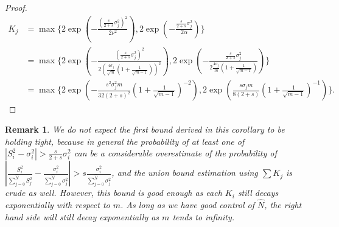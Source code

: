 \documentclass[pdflatex,sn-mathphys-num]{sn-jnl}%
\theoremstyle{thmstyleone}%
\theoremstyle{thmstyletwo}%
\newtheorem{remark}{Remark}%
\theoremstyle{thmstylethree}%
\begin{document}
\begin{proof}
	\begin{align*}
		K_j &= \max\{2\exp(-\frac{(\frac{s}{2+s}\sigma^2_j)^2}{2\nu^2}),2\exp(-\frac{\frac{s}{2+s}\sigma^2_j}{2\alpha}) \}\\
		&= \max\{2\exp(-\frac{(\frac{s}{2+s}\sigma^2_j)^2}{2(\frac{4\sigma_j}{\sqrt{m}}(1+\frac{1}{\sqrt{m-1}}))^2}), 2\exp(-\frac{\frac{s}{2+s}\sigma^2_j}{2 \frac{4\sigma_j}{m}(1+\frac{1}{\sqrt{m-1}})})\}\\
		&= \max\{2\exp(-\frac{s^2\sigma_j^2m}{32(2+s)^2}(1+\frac{1}{\sqrt{m-1}})^{-2}) , 2\exp(\frac{s\sigma_jm}{8(2+s)}(1+\frac{1}{\sqrt{m-1}})^{-1})\}. 
	\end{align*}
	
\end{proof}

\begin{remark}
	We do not expect the first bound derived in this corollary to be holding tight, because in general the probability of at least one of $|S_i^2 - \sigma_i^2| > \frac{s}{2+s} \sigma_i^2$ can be a considerable overestimate of the probability of $\left|\frac{S_i^2}{\sum_{j=0}^{\hat{N}}S_j^2} - \frac{\sigma_i^2}{\sum_{j=0}^{\hat{N}}\sigma_j^2}\right|>s\frac{\sigma_i^2}{\sum_{j=0}^{\hat{N}}\sigma_j^2}$, and the union bound estimation using $\sum K_j$ is crude as well. However, this bound is good enough as each $K_i$ still decays exponentially with respect to $m$. As long as we have good control of $\hat{N}$, the right hand side will still decay exponentially as $m$ tends to infinity. 
\end{remark}
\end{document}
